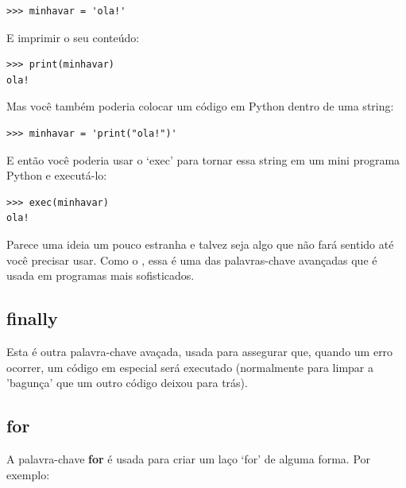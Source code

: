 \begin{listing}
\begin{verbatim}
>>> minhavar = 'ola!'
\end{verbatim}
\end{listing}

\noindent
E imprimir o seu conteúdo:

\begin{listing}
\begin{verbatim}
>>> print(minhavar)
ola!
\end{verbatim}
\end{listing}

\noindent
Mas você também poderia colocar um código em Python dentro de uma string:

\begin{listing}
\begin{verbatim}
>>> minhavar = 'print("ola!")'
\end{verbatim}
\end{listing}

\noindent
E então você poderia usar o `exec' para tornar essa string em um mini programa Python e executá-lo:

\begin{listing}
\begin{verbatim}
>>> exec(minhavar)
ola!
\end{verbatim}
\end{listing}

Parece uma ideia um pouco estranha e talvez seja algo que não fará sentido até você precisar usar. Como o , essa é uma das palavras-chave avançadas que é usada em programas mais sofisticados.

\subsection*{finally}

Esta é outra palavra-chave avaçada, usada para assegurar que, quando um erro ocorrer, um código em especial será executado (normalmente para limpar a 'bagunça' que um outro código deixou para trás).

\subsection*{for}

A palavra-chave \textbf{for} é usada para criar um laço `for' de alguma forma. Por exemplo:

